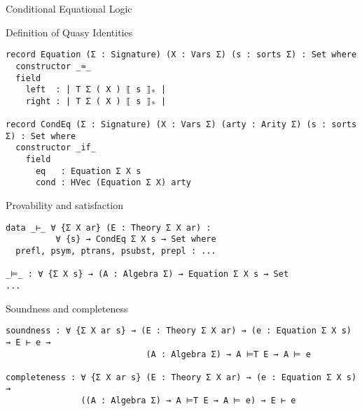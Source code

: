 \documentclass[11pt]{beamer}
\begin{document}
\begin{frame}[fragile]{Conditional Equational Logic}
  
\begin{block}{Definition of Quasy Identities}
  \begin{verbatim}
record Equation (Σ : Signature) (X : Vars Σ) (s : sorts Σ) : Set where
  constructor _≈_
  field
    left  : | T Σ ( X ) ⟦ s ⟧ₛ |
    right : | T Σ ( X ) ⟦ s ⟧ₛ |

record CondEq (Σ : Signature) (X : Vars Σ) (arty : Arity Σ) (s : sorts Σ) : Set where
  constructor _if_
    field
      eq   : Equation Σ X s
      cond : HVec (Equation Σ X) arty
  \end{verbatim}
\end{block}
\pause

\begin{block}{Provability and satisfaction}
\begin{verbatim}
data _⊢_ ∀ {Σ X ar} (E : Theory Σ X ar) :
          ∀ {s} → CondEq Σ X s → Set where
  prefl, psym, ptrans, psubst, prepl : ...

_⊨_ : ∀ {Σ X s} → (A : Algebra Σ) → Equation Σ X s → Set
...

\end{verbatim}
\end{block}
\pause

\begin{block}{Soundness and completeness}
\begin{verbatim}
soundness : ∀ {Σ X ar s} → (E : Theory Σ X ar) → (e : Equation Σ X s) → E ⊢ e →
                            (A : Algebra Σ) → A ⊨T E → A ⊨ e

completeness : ∀ {Σ X ar s} (E : Theory Σ X ar) → (e : Equation Σ X s) → 
               ((A : Algebra Σ) → A ⊨T E → A ⊨ e) → E ⊢ e
\end{verbatim}
\end{block}

\end{frame}
\end{document}
